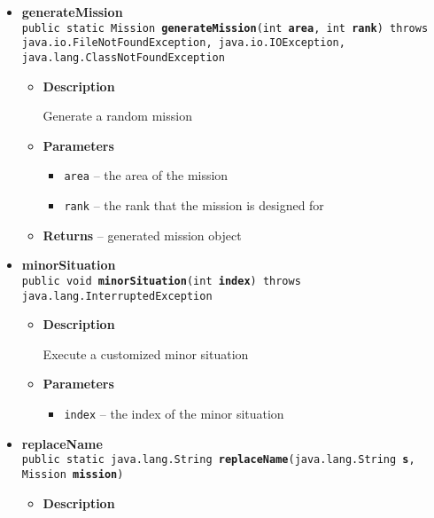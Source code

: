 {{{{{{\begin{itemize}
{\begin{itemize}
{Generate a final Mission
}
\item{
{\bf  Parameters}
  \begin{itemize}
   \item{
\texttt{area} -- the area of the mission}
  \end{itemize}
}%
\item{{\bf  Returns} -- 
the generated final mission 
}%
\end{itemize}
}%
\item{ 
{\bf  generateMission}\\
\texttt{public static Mission\ {\bf  generateMission}(\texttt{int} {\bf  area},
\texttt{int} {\bf  rank}) throws java.io.FileNotFoundException, java.io.IOException, java.lang.ClassNotFoundException
\label{personOfInterest.Mission.generateMission(int, int)}}%
\begin{itemize}
\item{
{\bf  Description}

Generate a random mission
}
\item{
{\bf  Parameters}
  \begin{itemize}
   \item{
\texttt{area} -- the area of the mission}
   \item{
\texttt{rank} -- the rank that the mission is designed for}
  \end{itemize}
}%
\item{{\bf  Returns} -- 
generated mission object 
}%
\end{itemize}
}%
\item{ 
{\bf  minorSituation}\\
\texttt{public void\ {\bf  minorSituation}(\texttt{int} {\bf  index}) throws java.lang.InterruptedException
\label{personOfInterest.Mission.minorSituation(int)}}%
\begin{itemize}
\item{
{\bf  Description}

Execute a customized minor situation
}
\item{
{\bf  Parameters}
  \begin{itemize}
   \item{
\texttt{index} -- the index of the minor situation}
  \end{itemize}
}%
\end{itemize}
}%
\item{ 
{\bf  replaceName}\\
\texttt{public static java.lang.String\ {\bf  replaceName}(\texttt{java.lang.String} {\bf  s},
\texttt{Mission} {\bf  mission})
\label{personOfInterest.Mission.replaceName(java.lang.String, personOfInterest.Mission)}}%
\begin{itemize}
\item{
{\bf  Description}

}
\end{itemize}}
\end{itemize}}}}}}}

